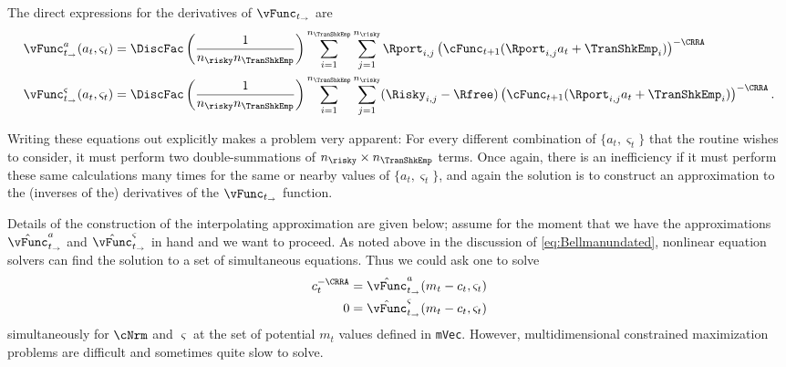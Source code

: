 The direct expressions for the derivatives of $\vFunc_{t_\rightarrow}$ are
\begin{equation}\begin{gathered}\begin{aligned}
      \vFunc_{t_\rightarrow}^{{a}}({a}_{t},\varsigma_{t})  & = \DiscFac \left(\frac{1}{n_{\risky} n_{\TranShkEmp}}\right)\sum_{i=1}^{n_{\TranShkEmp}}\sum_{j=1}^{n_{\risky} }\Rport_{i,j} \left(\cFunc_{t+1}(\Rport_{i,j}{a}_{t}+\TranShkEmp_{i})\right)^{-\CRRA}
      \\      \vFunc_{t_\rightarrow}^{\varsigma}({a}_{t},\varsigma_{t})  & = \DiscFac \left(\frac{1}{n_{\risky} n_{\TranShkEmp}}\right)\sum_{i=1}^{n_{\TranShkEmp}}\sum_{j=1}^{n_{\risky} }(\Risky_{i,j}-\Rfree)\left(\cFunc_{t+1}(\Rport_{i,j}{a}_{t}+\TranShkEmp_{i})\right)^{-\CRRA}.
    \end{aligned}\end{gathered}\end{equation}

Writing these equations out explicitly makes a problem very apparent: For every different combination of $\{{a}_{t},\varsigma_{t}\}$ that the routine wishes to consider, it must perform two double-summations of $n_{\risky} \times n_{\TranShkEmp}$ terms.  Once again, there is an inefficiency if it must perform these same calculations many times for the same or nearby values of $\{{a}_{t},\varsigma_{t}\}$, and again the solution is to construct an approximation to the (inverses of the) derivatives of the $\vFunc_{t_\rightarrow}$ function.

Details of the construction of the interpolating approximation are given below; assume for the moment that we have the approximations $\hat{\vFunc}_{t_\rightarrow}^{{a}}$ and $\hat{\vFunc}_{t_\rightarrow}^{\varsigma}$ in hand and we want to proceed.  As noted above in the discussion of \eqref{eq:Bellmanundated}, nonlinear equation solvers can find the solution to a set of simultaneous equations.  Thus we could ask one to solve
\begin{equation}\begin{gathered}\begin{aligned}
      {c}_{t}^{-\CRRA}  & = \hat{\vFunc}^{a}_{{t_\rightarrow}}({m}_{t}-{c}_{t},\varsigma_{t}) %
      \\      0  & = \hat{\vFunc}^{\varsigma}_{{t_\rightarrow}}({m}_{t}-{c}_{t},\varsigma_{t}) \label{eq:FOCwrtw}
    \end{aligned}\end{gathered}\end{equation}
simultaneously for $\cNrm$ and $\varsigma$ at the set of potential ${m}_{t}$ values defined in {\texttt{mVec}}. However, multidimensional constrained
maximization problems are difficult and sometimes quite slow to
solve.

